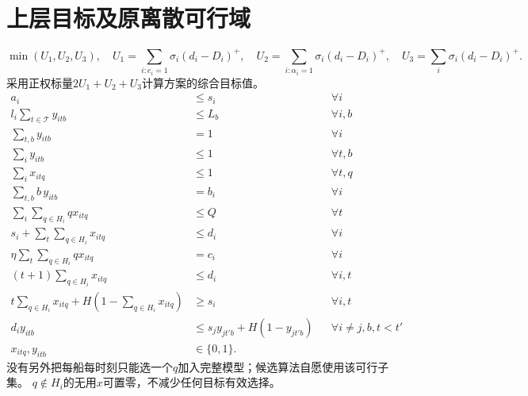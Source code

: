 \documentclass[11pt]{ctexart}
\begin{document}
\section*{上层目标及原离散可行域}
\[
\min(U_1,U_2,U_3),\quad
U_1=\sum_{i:e_i=1}\sigma_i(d_i-D_i)^+,\quad
U_2=\sum_{i:\alpha_i=1}\sigma_i(d_i-D_i)^+,\quad
U_3=\sum_i\sigma_i(d_i-D_i)^+.
\]
采用正权标量$2U_1+U_2+U_3$计算方案的综合目标值。
\begin{align}
a_i&\le s_i &&\forall i \tag{4}\\
l_i\sum_{t\in\mathcal T}y_{itb}&\le L_b &&\forall i,b \tag{5}\\
\sum_{t,b}y_{itb}&=1 &&\forall i \tag{6}\\
\sum_i y_{itb}&\le1 &&\forall t,b \tag{7}\\
\sum_i x_{itq}&\le1 &&\forall t,q \tag{8}\\
\sum_{t,b}b\,y_{itb}&=b_i &&\forall i \tag{9}\\
\sum_i\sum_{q\in H_i}q x_{itq}&\le Q &&\forall t \tag{10}\\
s_i+\sum_t\sum_{q\in H_i}x_{itq}&\le d_i &&\forall i \tag{11}\\
\eta\sum_t\sum_{q\in H_i}q x_{itq}&=c_i &&\forall i \tag{12}\\
(t+1)\sum_{q\in H_i}x_{itq}&\le d_i &&\forall i,t \tag{13}\\
t\sum_{q\in H_i}x_{itq}+H(1-\sum_{q\in H_i}x_{itq})&\ge s_i &&\forall i,t \tag{14}\\
d_i y_{itb}&\le s_j y_{jt'b}+H(1-y_{jt'b})
&&\forall i\ne j,b,t<t' \tag{15}\\
x_{itq},y_{itb}&\in\{0,1\}. && \tag{16}
\end{align}
没有另外把每船每时刻只能选一个$q$加入完整模型；候选算法自愿使用该可行子集。
$q\notin H_i$的无用$x$可置零，不减少任何目标有效选择。
\end{document}
